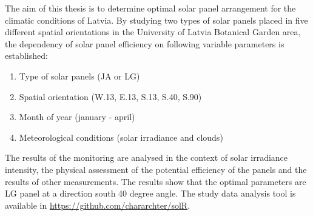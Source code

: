 The aim of this thesis is to determine optimal solar panel arrangement for the climatic conditions of Latvia.
By studying two types of solar panels placed in five different spatial orientations in the University of Latvia Botanical Garden area, the dependency of solar panel efficiency on following variable parameters is established:
\begin{enumerate}
\item Type of solar panels (JA or LG)
\item Spatial orientation (W.13, E.13, S.13, S.40, S.90)
\item Month of year (january - april)
\item Meteorological conditions (solar irradiance and clouds)
\end{enumerate}

The results of the monitoring are analysed in the context of solar irradiance intensity, the physical assessment of the potential efficiency of the panels and the results of other measurements.
The results show that the optimal parameters are LG panel at a direction south 40 degree angle. The study data analysis tool is available in \url{https://github.com/chararchter/solR}.

